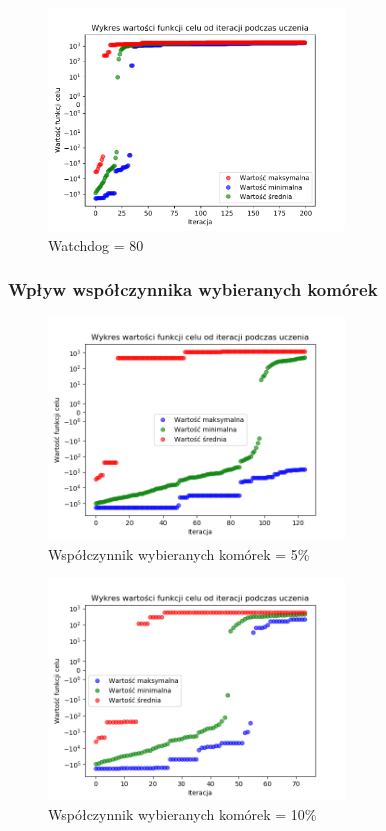 \documentclass[a4paper]{article}
\begin{document}
\begin{figure}[H]
    \centering
    \includegraphics[width=0.7\textwidth]{plots/watchdog_80.pdf}
    \caption{Watchdog = 80}
    \label{fig:watchdog_80}
\end{figure}


\subsubsection{Wpływ współczynnika wybieranych komórek}
\begin{figure}[H]
    \centering
    \includegraphics[width=0.7\textwidth]{plots/selection_05.png}
    \caption{Współczynnik wybieranych komórek = 5\%}
    \label{fig:selection_05}
\end{figure}

\begin{figure}[H]
    \centering
    \includegraphics[width=0.7\textwidth]{plots/selection_10.png}
    \caption{Współczynnik wybieranych komórek = 10\%}
    \label{fig:selection_10}
\end{figure}
\end{document}
